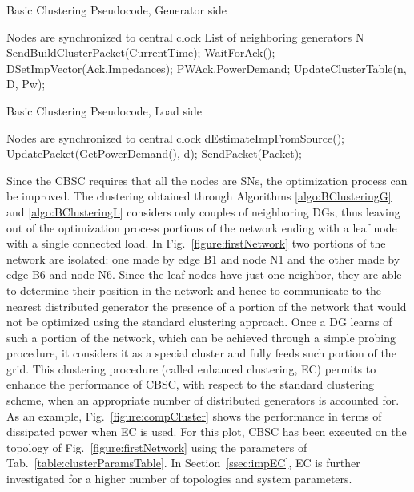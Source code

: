 \documentclass[journal]{IEEEtran}
\newcommand{\fig}[1]{Fig.~\ref{#1}}
\newcommand{\tab}[1]{Tab.~\ref{#1}}
\newcommand{\secref}[1]{Section~\ref{#1}}
\begin{document}
\begin{algorithm}
\caption{Basic Clustering Pseudocode, Generator side}\label{algo:BClusteringG}
\begin{algorithmic}[1]
\REQUIRE Nodes are synchronized to central clock
\REQUIRE List of neighboring generators N \label{line:NA}
\STATE SendBuildClusterPacket(CurrentTime); \label{line:buildCPkt}
\STATE WaitForAck();
\STATE DSetImpVector(Ack.Impedances);
\STATE PWAck.PowerDemand;
\STATE UpdateClusterTable(n, D, Pw);
\ENDIF
\ENDFOR
\end{algorithmic}
\end{algorithm} 

\begin{algorithm}
\caption{Basic Clustering Pseudocode, Load side}\label{algo:BClusteringL}
\begin{algorithmic}[1]
\REQUIRE Nodes are synchronized to central clock
\STATE dEstimateImpFromSource();\label{line:estDist}
\STATE UpdatePacket(GetPowerDemand(), d);\label{line:upPkt}
\STATE SendPacket(Packet);\label{line:sendUpPkt}
\ENDIF
\end{algorithmic}
\end{algorithm}


Since the CBSC requires that all the nodes are SNs, the optimization process can be improved. The clustering obtained through Algorithms \ref{algo:BClusteringG} and \ref{algo:BClusteringL} considers only couples of neighboring DGs, thus leaving out of the optimization process portions of the network ending with a leaf node with a single connected load. In \fig{figure:firstNetwork} two portions of the network are isolated: one made by edge B1 and node N1 and the other made by edge B6 and node N6. Since the leaf nodes have just one neighbor, they are able to determine their position in the network and hence to communicate to the nearest distributed generator the presence of a portion of the network that would not be optimized using the standard clustering approach. Once a DG learns of such a portion of the network, which can be achieved through a simple probing procedure, it considers it as a special cluster and fully feeds such portion of the grid. This clustering procedure (called enhanced clustering, EC) permits to enhance the performance of CBSC, with respect to the standard clustering scheme, when an appropriate number of distributed generators is accounted for. As an example, \fig{figure:compCluster} shows the performance in terms of dissipated power when EC is used. For this plot, CBSC has been executed on the topology of \fig{figure:firstNetwork} using the parameters of \tab{table:clusterParamsTable}. In \secref{ssec:impEC}, EC is further investigated for a higher number of topologies and system parameters.
\end{document}
